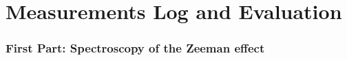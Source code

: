 \section{Measurements Log and Evaluation}
\subsubsection{First Part: Spectroscopy of the Zeeman effect}